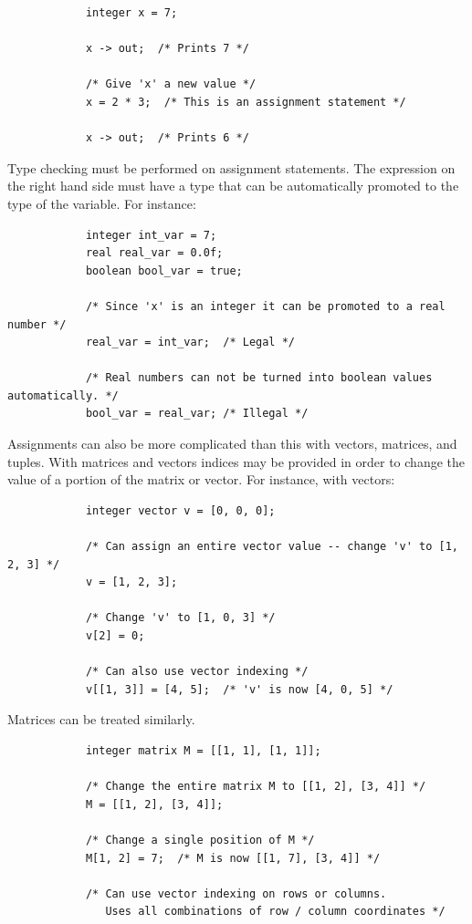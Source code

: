 \documentclass{article}
\begin{document}
		\begin{lstlisting}
			integer x = 7;

			x -> out;  /* Prints 7 */

			/* Give 'x' a new value */
			x = 2 * 3;  /* This is an assignment statement */

			x -> out;  /* Prints 6 */
		\end{lstlisting}

		Type checking must be performed on assignment statements. The expression on the right hand side must have a type
		that can be automatically promoted to the type of the variable. For instance:

		\begin{lstlisting}
			integer int_var = 7;
			real real_var = 0.0f;
			boolean bool_var = true;

			/* Since 'x' is an integer it can be promoted to a real number */
			real_var = int_var;  /* Legal */

			/* Real numbers can not be turned into boolean values automatically. */
			bool_var = real_var; /* Illegal */
		\end{lstlisting}

		Assignments can also be more complicated than this with vectors, matrices, and tuples. With matrices and vectors
		indices may be provided in order to change the value of a portion of the matrix or vector. For instance, with
		vectors:

		\begin{lstlisting}
			integer vector v = [0, 0, 0];

			/* Can assign an entire vector value -- change 'v' to [1, 2, 3] */
			v = [1, 2, 3];

			/* Change 'v' to [1, 0, 3] */
			v[2] = 0;

			/* Can also use vector indexing */
			v[[1, 3]] = [4, 5];  /* 'v' is now [4, 0, 5] */
		\end{lstlisting}

		Matrices can be treated similarly.

		\begin{lstlisting}
			integer matrix M = [[1, 1], [1, 1]];

			/* Change the entire matrix M to [[1, 2], [3, 4]] */
			M = [[1, 2], [3, 4]];

			/* Change a single position of M */
			M[1, 2] = 7;  /* M is now [[1, 7], [3, 4]] */

			/* Can use vector indexing on rows or columns.
			   Uses all combinations of row / column coordinates */
		\end{lstlisting}
\end{document}
